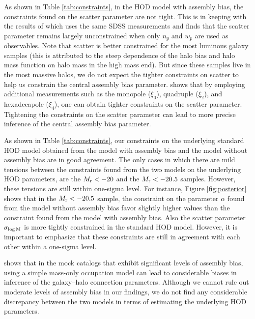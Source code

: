 \documentclass[12pt, preprint]{aastex}
\newcommand{\sigmam}{\sigma_{\log \rm M}}
\begin{document}
As shown in Table \ref{tab:constraints}, in the HOD model with assembly bias, the constraints found on the scatter parameter are not tight. This is in keeping with the results of \citet{guo2015} which uses the same SDSS measurements and finds that the scatter parameter remains largely unconstrained when only $n_{g}$ and $w_{p}$ are used as observables. Note that scatter is better constrained for the most luminous galaxy samples (this is attributed to the steep dependence of the halo bias and halo mass function on halo mass in the high mass end). But since these samples live in the most massive halos, we do not expect the tighter constraints on scatter to help us constrain the central assembly bias parameter. \citet{guo2015} shows that by employing additional measurements such as the monopole ($\xi_{0}$), quadruple ($\xi_{2}$), and hexadecapole ($\xi_{4}$), one can obtain tighter constraints on the scatter parameter. Tightening the constraints on the scatter parameter can lead to more precise inference of the central assembly bias parameter.    

As shown in Table \ref{tab:constraints}, our constraints on the underlying standard HOD model obtained from the model with assembly bias and the model without assembly bias are in good agreement. The only cases in which there are mild tensions between the constraints found from the two models on the underlying HOD parameters, are the $M_{\rm r}<-20$ and the $M_{\rm r}<-20.5$ samples. However, these tensions are still within one-sigma level. For instance, Figure \ref{fig:posterior} shows that in the $M_{\rm r}<-20.5$ sample, the constraint on the parameter $\alpha$ found from the model without assembly bias favor slightly higher values than the constraint found from the model with assembly bias. Also the scatter parameter $\sigmam$ is more tightly constrained in the standard HOD model. However, it is important to emphasize that these constraints are still in agreement with each other within a one-sigma level. 

\citet{arz2014} shows that in the mock catalogs that exhibit significant levels of assembly bias, using a simple mass-only occupation model can lead to considerable biases in inference of the galaxy--halo connection parameters. Although we cannot rule out moderate levels of assembly bias in our findings, we do not find any considerable discrepancy between the two models in terms of estimating the underlying HOD parameters. 
 
\end{document}
